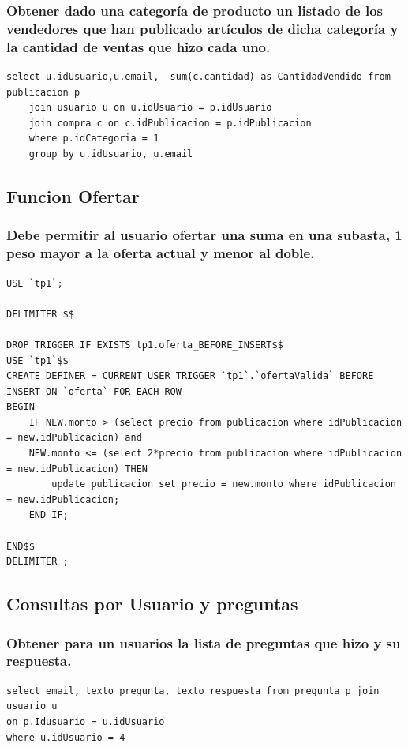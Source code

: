\documentclass[a4paper, 10pt, twoside]{article}
\begin{document}
\subsubsection{Obtener dado una categor\'ia de producto un listado de los vendedores que han publicado art\'iculos de dicha categor\'ia y la cantidad de ventas que hizo cada uno.
}
\begin{verbatim}
select u.idUsuario,u.email,  sum(c.cantidad) as CantidadVendido from publicacion p 
	join usuario u on u.idUsuario = p.idUsuario
    join compra c on c.idPublicacion = p.idPublicacion
	where p.idCategoria = 1
    group by u.idUsuario, u.email
\end{verbatim}

\subsection{Funcion Ofertar}
\subsubsection{Debe permitir al usuario ofertar una suma en una subasta, 1 peso mayor a la oferta actual y menor al doble. }

\begin{verbatim}
USE `tp1`;

DELIMITER $$

DROP TRIGGER IF EXISTS tp1.oferta_BEFORE_INSERT$$
USE `tp1`$$
CREATE DEFINER = CURRENT_USER TRIGGER `tp1`.`ofertaValida` BEFORE INSERT ON `oferta` FOR EACH ROW
BEGIN
	IF NEW.monto > (select precio from publicacion where idPublicacion = new.idPublicacion) and 
	NEW.monto <= (select 2*precio from publicacion where idPublicacion = new.idPublicacion) THEN
		update publicacion set precio = new.monto where idPublicacion = new.idPublicacion;
	END IF;
 -- 
END$$
DELIMITER ;

\end{verbatim}
\subsection{Consultas por Usuario y preguntas}
\subsubsection{Obtener para un usuarios la lista de preguntas que hizo y su respuesta.}
\begin{verbatim}
select email, texto_pregunta, texto_respuesta from pregunta p join usuario u 
on p.Idusuario = u.idUsuario 
where u.idUsuario = 4
\end{verbatim}
\end{document}
